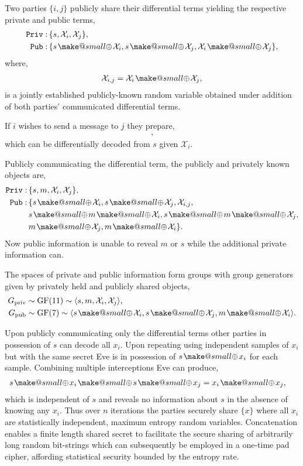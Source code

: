 \documentclass[twocolumn, aps, amsmath, amssymb, nofootinbib, superscriptaddress, longbibliography, doublefloatfix, table-of-contents, eqsecnum, rmp]{revtex4-2}
\makeatletter
\newcommand{\soplus}{{{\hspace{1pt}}{\mathbin{\mathpalette\make@small\oplus}}}{\hspace{1pt}}}
\newcommand{\make@small}[2]{%
  \vcenter{\hbox{%
    \scalebox{0.6}{$\m@th#1#2$}%
  }}%
}
\makeatother
\begin{document}
Two parties $\{i,j\}$ publicly share their differential terms yielding the respective private and public terms,
\begin{align}
	\mathtt{Priv}:\, &\{s,\mathcal{X}_i,\mathcal{X}_j\},\nonumber\\
	\mathtt{Pub}:\, &\{s\soplus \mathcal{X}_i, s\soplus \mathcal{X}_j, \mathcal{X}_i\soplus\mathcal{X}_j \},
\end{align}
where,
\begin{align}
	\mathcal{X}_{i,j} = \mathcal{X}_i\soplus\mathcal{X}_j,
\end{align}
is a jointly established publicly-known random variable obtained under addition of both parties' communicated differential terms.

If $i$ wishes to send a message to $j$ they prepare,
\begin{align}
	[s, s\soplus m \soplus \mathcal{X}_i],
\end{align}
which can be differentially decoded from $s$ given $\mathcal{X}_i$.

Publicly communicating the differential term, the publicly and privately known objects are, 
\begin{align}
	\mathtt{Priv}:\, &\{s,m,\mathcal{X}_i,\mathcal{X}_j\},\nonumber\\
	\mathtt{Pub}:\, &\{s\soplus \mathcal{X}_i, s\soplus \mathcal{X}_j, \mathcal{X}_{i,j},\nonumber\\
	 &s\soplus m\soplus \mathcal{X}_i, s\soplus m\soplus \mathcal{X}_j,\nonumber\\
	 &m\soplus \mathcal{X}_j, m\soplus\mathcal{X}_i \}.
\end{align}
Now public information is unable to reveal $m$ or $s$ while the additional private information can.

The spaces of private and public information form groups with group generators given by privately held and publicly shared objects,
\begin{align}
	G_\mathrm{priv} &\sim \mathrm{GF}(11) \sim \langle s,m,\mathcal{X}_i,\mathcal{X}_j \rangle, \nonumber\\
	G_\mathrm{pub} &\sim \mathrm{GF}(7) \sim \langle s\soplus \mathcal{X}_i, s\soplus \mathcal{X}_j, m\soplus\mathcal{X}_i \rangle.
\end{align}

Upon publicly communicating only the differential terms other parties in possession of $s$ can decode all $x_i$. Upon repeating using independent samples of $x_i$ but with the same secret Eve is in possession of $s\soplus x_i$ for each sample. Combining multiple interceptions Eve can produce,
\begin{align}
	s\soplus x_i \soplus s \soplus x_j &= x_i \soplus x_j,
\end{align}
which is independent of $s$ and reveals no information about $s$ in the absence of knowing any $x_i$. Thus over $n$ iterations the parties securely share $\{x\}$ where all $x_i$ are statistically independent, maximum entropy random variables. Concatenation enables a finite length shared secret to facilitate the secure sharing of arbitrarily long random bit-strings which can subsequently be employed in a one-time pad cipher, affording statistical security bounded by the entropy rate.
\end{document}
